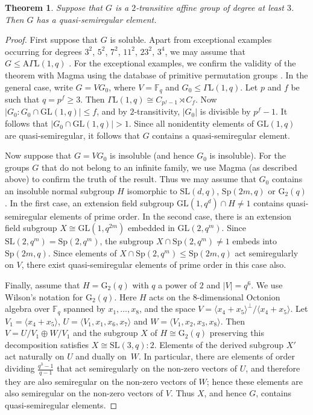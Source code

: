 \documentclass{article}
\newtheorem{thm}{Theorem}[section]
\theoremstyle{remark}
\theoremstyle{definition}
\newcommand{\GL}{\mathrm{GL}}
\newcommand{\SL}{\mathrm{SL}}
\newcommand{\Sp}{\mathrm{Sp}}
\newcommand{\qsr}{quasi-semiregular}
\newcommand{\qsre}{quasi-semiregular element}
\newcommand{\qsres}{quasi-semiregular elements}
\begin{document}
\begin{thm}
\label{thm: 2-trans affine thm}
Suppose that $G$ is a $2$-transitive  affine group of degree at least $3$. Then $G$ has a {\qsre}.
\end{thm}
\begin{proof}
First suppose that $G$ is soluble. Apart from exceptional examples occurring for degrees $3^2$, $5^2$, $7^2$, $11^2$, $23^2$, $3^4$, we may assume that $G \leqslant \mathrm{A}\Gamma\mathrm{L}(1,q)$    \cite[XII, 7.3]{HuppertBlackburn}. For the exceptional examples, we confirm the validity of the  theorem with {\sc Magma} \cite{Magma} using the database of primitive permutation groups \cite{Colva}. In the general case,  write $G = V G_0$, where $V=\mathbb F_q$ and $G_0 \leqslant \Gamma\mathrm{L}(1,q)$. Let $p$ and $f$ be such that $q=p^f\geqslant3$. Then $\Gamma\mathrm{L}(1,q) \cong C_{p^f-1}\rtimes C_f$. Now $|G_0 : G_0\cap \GL(1,q)| \leqslant f$, and by $2$-transitivity, $|G_0|$ is divisible by $p^f-1$. It follows that $|G_0 \cap \GL(1,q)| > 1$.  Since all nonidentity elements of $\GL(1,q)$ are {\qsr}, it follows that $G$ contains a {\qsre}. 

Now suppose that $G=VG_0$ is insoluble (and hence $G_0$ is insoluble). For the groups $G$ that do not belong to an infinite family, we use {\sc Magma} (as described above) to confirm the truth of the result. Thus we may assume  that $G_0$ contains an insoluble normal subgroup $H$ isomorphic to $\SL(d,q)$, $\Sp(2m,q)$ or $\mathrm G_2(q)$. In the first case, an extension field subgroup  $\GL(1,q^d) \cap H\neq 1$ contains {\qsres} of prime order. In the second case, there is an extension field subgroup $X \cong \GL(1,q^{2m})$ embedded in $\GL(2,q^m)$.  Since $\SL(2,q^m)=\Sp(2,q^m)$, the subgroup  $X \cap \Sp(2,q^m)\neq 1$ embeds into $\Sp(2m,q)$. Since elements of $X \cap \Sp(2,q^m) \leqslant \Sp(2m,q)$ act semiregularly on $V$, there exist {\qsres} of prime order in this case also.

Finally, assume that $H=\mathrm G_2(q)$ with $q$  a power of $2$ and $|V|=q^6$. We use Wilson's notation \cite[4.4.3]{WilsonBook}  for $\mathrm G_2(q)$. Here $H$ acts on the $8$-dimensional Octonion algebra over $\mathbb F_q$ spanned by $x_1,\ldots,x_8$, and the space $V = \langle x_4 + x_5 \rangle^\perp / \langle x_4 + x_5 \rangle$. 
Let $V_1=\langle x_4+x_5\rangle$,  $U=\langle V_1, x_1,x_6,x_7\rangle$ and $W=\langle V_1, x_2, x_3, x_8 \rangle$. Then $V = U/V_1 \oplus W/V_1$ and the subgroup $X$ of $H\cong \mathrm G_2(q)$ preserving this decomposition satisfies $X \cong \SL(3,q) :2$. Elements of the derived subgroup $X'$ act naturally on $U$ and dually on~$W$. In particular, there are elements of order dividing $\frac{q^3-1}{q-1}$ that act semiregularly on the non-zero vectors of $U$, and therefore they are also semiregular on the non-zero vectors of $W$; hence these elements are also semiregular on the non-zero vectors of $V$. Thus $X$, and hence $G$, contains {\qsres}.
\end{proof}
\end{document}
